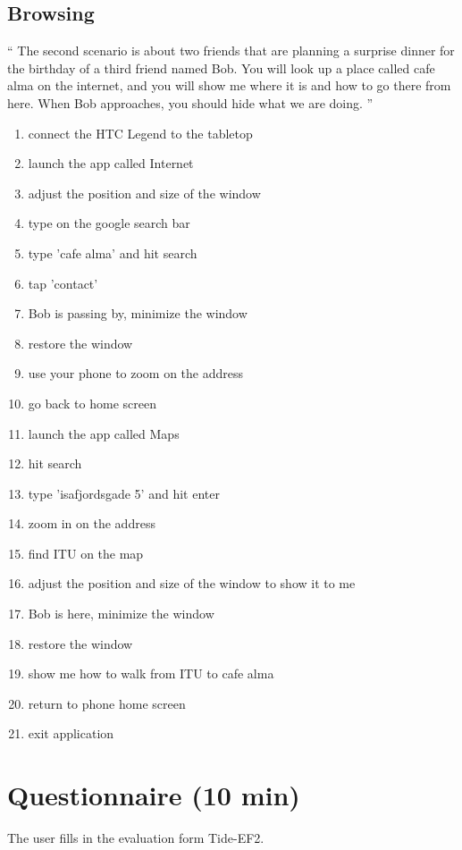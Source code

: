 \subsection{Browsing}

``
The second scenario is about two friends that are planning a surprise dinner for the birthday of a third friend named Bob. 
You will look up a place called cafe alma on the internet, and you will show me where it is and how to go there from here.
When Bob approaches, you should hide what we are doing.
''

\begin{enumerate}
\item connect the HTC Legend to the tabletop
\item launch the app called Internet
\item adjust the position and size of the window
\item type on the google search bar
\item type 'cafe alma' and hit search
\item tap 'contact'
\item Bob is passing by, minimize the window
\item restore the window
\item use your phone to zoom on the address
\item go back to home screen
\item launch the app called Maps
\item hit search
\item type 'isafjordsgade 5' and hit enter
\item zoom in on the address
\item find ITU on the map
\item adjust the position and size of the window to show it to me
\item Bob is here, minimize the window
\item restore the window
\item show me how to walk from ITU to cafe alma
\item return to phone home screen
\item exit application
\end{enumerate}

\section{Questionnaire (10 min)}

The user fills in the evaluation form Tide-EF2.

